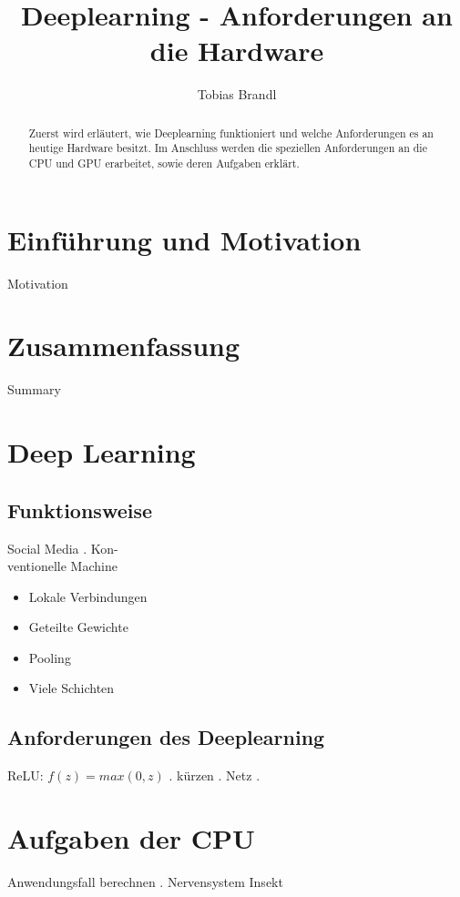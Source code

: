 \documentclass[pdftex,a4paper,halfparskip]{scrartcl}
\title{ Deeplearning - Anforderungen an die Hardware} %
\author{Tobias Brandl}	%
\begin{document}
\maketitle	%

\begin{abstract}
Zuerst wird erl\"autert, wie Deeplearning funktioniert und welche Anforderungen es an heutige Hardware besitzt.
Im Anschluss werden die speziellen Anforderungen an die CPU und GPU erarbeitet, sowie deren Aufgaben erkl\"art.
\end{abstract}


\tableofcontents

\section{Einf\"uhrung und Motivation}
Motivation

\section{Zusammenfassung}
Summary

\section{Deep Learning}

\subsection{Funktionsweise}
Social Media \cite{lecun-nature-15}.
Kon-\\ventionelle Machine

\begin{itemize}
        \item Lokale Verbindungen
        \item Geteilte Gewichte
        \item Pooling
        \item Viele Schichten
\end{itemize}

\subsection{Anforderungen des Deeplearning}
ReLU: $f(z) = max(0, z)$ \cite{lecun-nature-15}.
k\"urzen \cite{lecun-nature-15}.
Netz \cite{benchmark-article} .


\section{Aufgaben der CPU}
Anwendungsfall berechnen \cite{intel-outperform}. Nervensystem Insekt
\end{document}
